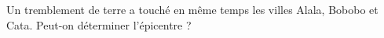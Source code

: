 
\begin{exercice}\label{exosmath-0926}

Un tremblement de terre a touché en même temps les villes Alala, Bobobo et Cata. Peut-on déterminer l'épicentre ?
\begin{center}
   
\end{center}


\end{exercice}
